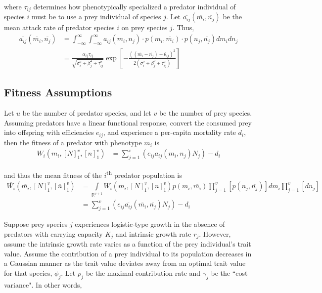 \documentclass[12pt]{article}
\begin{document}
\noindent where $\tau_{ij}$ determines how phenotypically specialized a predator individual of species $i$ must be to use a prey individual of species $j$.  Let $\overline{a_{ij}}(\overline{m_i}, \overline{n_j})$ be the mean attack rate of predator species $i$ on prey species $j$.  Thus,
\begin{align*}
	\overline{a_{ij}}(\overline{m_i}, \overline{n_j}) &= \int_{-\infty}^{\infty}\int_{-\infty}^{\infty} a_{ij}(m_i, n_j) \cdot p(m_i, \overline{m_i}) \cdot p(n_j, \overline{n_j}) dm_i dn_j \\
	&= \frac{\alpha_{ij}\tau_{ij}}{\sqrt{\sigma_i^2 + \beta_j^2 + \tau_{ij}^2}}\exp\left[{-\frac{((\overline{m_i} - \overline{n_j}) - \theta_{ij})^2}{2(\sigma_i^2 + \beta_j^2 + \tau_{ij}^2)}}\right]
\end{align*}

\subsection*{Fitness Assumptions}
\noindent Let $u$ be the number of predator species, and let $v$ be the number of prey species.  Assuming predators have a linear functional response, convert the consumed prey into offspring with efficiencies $e_{ij}$, and experience a per-capita mortality rate $d_i$, then the fitness of a predator with phenotype $m_i$ is
\begin{align*}
	W_i(m_i, [N]_1^v, [n]_1^v) &= \sum_{j = 1}^v\left(e_{ij}a_{ij}(m_i, n_j)N_j\right) - d_i
\end{align*}

\noindent and thus the mean fitness of the $i$\textsuperscript{th} predator population is
\begin{align*}
	\overline{W_i}(\overline{m_i}, [N]_1^v, [\overline{n}]_1^v) &= \int\limits_{\mathbb{R}^{v+1}} W_i(m_i, [N]_1^v, [n]_1^v) p(m_i, \overline{m_i}) \prod\limits_{j = 1}^{v}\left[p(n_j, \overline{n_j})\right] dm_i \prod\limits_{j = 1}^{v}\left[dn_j\right] \\
	&= \sum_{j=1}^v\left(e_{ij}\overline{a_{ij}}(\overline{m_i}, \overline{n_j})N_j\right) - d_i
\end{align*}

\noindent Suppose prey species $j$ experiences logistic-type growth in the absence of predators with carrying capacity $K_j$ and intrinsic growth rate $r_j$.  However, assume the intrinsic growth rate varies as a function of the prey individual's trait value.  Assume the contribution of a prey individual to its population decreases in a Gaussian manner as the trait value deviates away from an optimal trait value for that species, $\phi_j$.  Let $\rho_j$ be the maximal contribution rate and $\gamma_j$ be the ``cost variance".  In other words,
\end{document}
